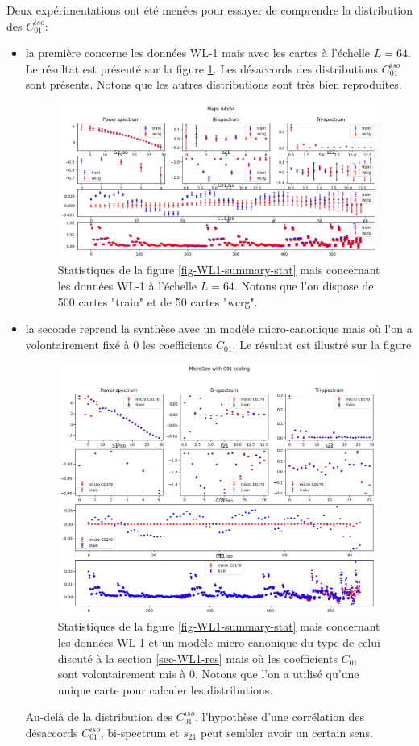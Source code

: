 \documentclass[12pt,twoside]{article}
\newcommand{\itemb}{\item[$\bullet$]}
\begin{document}
Deux expérimentations ont été menées pour essayer de comprendre la distribution des $C_{01}^{iso}$:
\begin{itemize}
\itemb la première concerne les données WL-1 mais avec les cartes à l'échelle $L=64$. Le résultat est présenté sur la figure \ref{fig-WL1-64x64-summary-stat}. Les désaccords des distributions $C_{01}^{iso}$ sont présents. Notons que les autres distributions sont très bien reproduites. 
\begin{figure}
\centering
\includegraphics[width=0.99\textwidth]{fig-WL1-64x64-summary-stat.png}
\caption{Statistiques de la figure \ref{fig-WL1-summary-stat} mais concernant les données WL-1 à l'échelle $L=64$. Notons que l'on dispose de 500 cartes "train" et de 50 cartes "wcrg".}
\label{fig-WL1-64x64-summary-stat}
\end{figure}
\itemb la seconde reprend la synthèse avec un modèle micro-canonique mais où l'on a volontairement fixé à 0 les coefficients $C_{01}$. Le résultat est illustré sur la figure 
\begin{figure}
\centering
\includegraphics[width=0.99\textwidth]{fig-WL1-micro-C01scaling.png}
\caption{Statistiques de la figure \ref{fig-WL1-summary-stat} mais concernant les données WL-1 et un modèle micro-canonique du type de celui discuté à la section \ref{sec-WL1-res} mais où les coefficients $C_{01}$ sont volontairement mis à 0. Notons que l'on a utilisé qu'une unique carte pour calculer les distributions.}
\label{fig-WL1-micro-C01scaling}
\end{figure}
Au-delà de la distribution des $C_{01}^{iso}$, l'hypothèse d'une corrélation des désaccords $C_{01}^{iso}$,  bi-spectrum et $s_{21}$ peut sembler avoir un certain sens.
\end{itemize}
%
\end{document}
